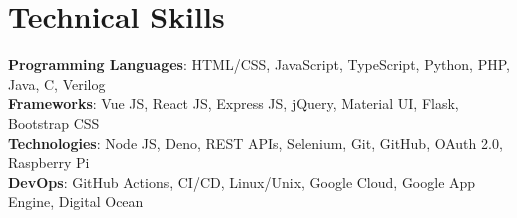 \section{Technical Skills}
 \begin{itemize}[leftmargin=0.15in, label={}]
    \small{\item{
     \textbf{Programming Languages}{: HTML/CSS, JavaScript, TypeScript, Python, PHP, Java, C, Verilog} \\
     \textbf{Frameworks}{: Vue JS, React JS, Express JS, jQuery, Material UI, Flask, Bootstrap CSS } \\
     \textbf{Technologies}{: Node JS, Deno, REST APIs, Selenium, Git, GitHub, OAuth 2.0, Raspberry Pi } \\
     \textbf{DevOps}{: GitHub Actions, CI/CD, Linux/Unix, Google Cloud, Google App Engine, Digital Ocean }
    }}
 \end{itemize}
